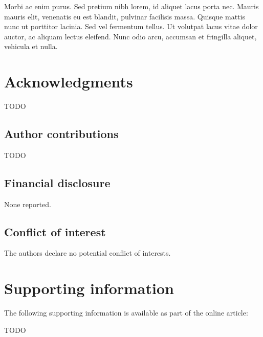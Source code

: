 \documentclass[AMA,STIX2COL,Linenumberson]{MRM}
\begin{document}
Morbi ac enim purus. Sed pretium nibh lorem, id aliquet lacus porta nec. Mauris mauris elit, venenatis eu est blandit, pulvinar facilisis massa. Quisque mattis nunc ut porttitor lacinia. Sed vel fermentum tellus. Ut volutpat lacus vitae dolor auctor, ac aliquam lectus eleifend. Nunc odio arcu, accumsan et fringilla aliquet, vehicula et nulla.

\section*{Acknowledgments}

TODO

\subsection*{Author contributions}

TODO

\subsection*{Financial disclosure}

None reported.

\subsection*{Conflict of interest}

The authors declare no potential conflict of interests.

%
\vfill\pagebreak

\section*{Supporting information}
The following supporting information is available as part of the online article:

TODO
\end{document}
